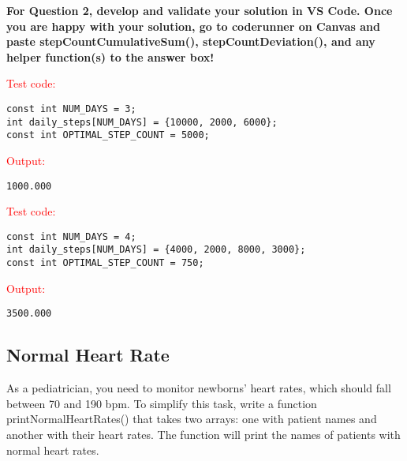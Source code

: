 \textbf{For Question 2, develop and validate your solution in VS Code. Once you are happy with your solution, go to coderunner on Canvas and paste stepCountCumulativeSum(),  stepCountDeviation(), and any helper function(s) to the answer box!} 

\begin{sample}
\textcolor{red}{Test code:}
\begin{verbatim}
const int NUM_DAYS = 3;
int daily_steps[NUM_DAYS] = {10000, 2000, 6000};
const int OPTIMAL_STEP_COUNT = 5000;
\end{verbatim}
\textcolor{red}{Output:}
\begin{verbatim}
1000.000
\end{verbatim}
\end{sample}

\begin{sample}
\textcolor{red}{Test code:}
\begin{verbatim}
const int NUM_DAYS = 4;
int daily_steps[NUM_DAYS] = {4000, 2000, 8000, 3000};
const int OPTIMAL_STEP_COUNT = 750;
\end{verbatim}
\textcolor{red}{Output:}
\begin{verbatim}
3500.000
\end{verbatim}
\end{sample}

\subsection{Normal Heart Rate}

As a pediatrician, you need to monitor newborns' heart rates, which should fall between 70 and 190 bpm. To simplify this task, write a function printNormalHeartRates() that takes two arrays: one with patient names and another with their heart rates. The function will print the names of patients with normal heart rates.

